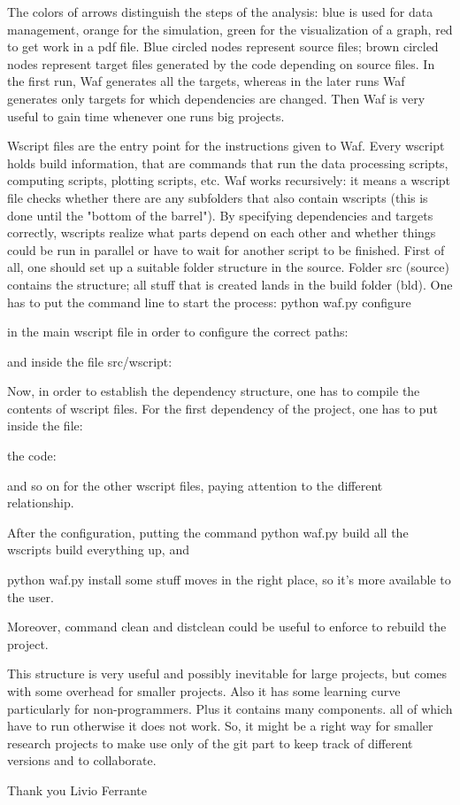 \documentclass{article}
\begin{document}
The colors of arrows distinguish the steps of the analysis: blue is used for data management, orange for the simulation, green for the visualization of a graph, red to get work in a pdf file.
Blue circled nodes represent source files; brown circled nodes represent target files generated by the code depending on source files. 
In the first run, Waf generates all the targets, whereas in the later runs Waf generates only targets for which dependencies are changed. Then Waf is very useful to gain time whenever one runs big projects. 

Wscript files are the entry point for the instructions given to Waf. Every wscript holds build information, that are commands that run the data processing scripts,  computing scripts, plotting scripts, etc. 
Waf works recursively: it means a wscript file checks whether there are any subfolders that also contain wscripts (this is done until the "bottom of the barrel"). By specifying dependencies and targets correctly, wscripts realize what parts depend on each other and whether things could be run in parallel or have to wait for another script to be finished.
First of all, one should set up a suitable folder structure in the source. Folder src (source) contains the structure; all stuff that is created lands in the build folder (bld). 
One has to put the command line to start the process:  
python waf.py configure  

in the main wscript file in order to configure the correct paths:

and inside the file src/wscript:

Now, in order to establish the dependency structure, one has to compile the contents of wscript files.
For the first dependency of the project, one has to put inside the file:


the code:

and so on for the other wscript files, paying attention to the different relationship.

After the configuration, putting the command
python waf.py build
all the wscripts build everything up, and

python waf.py install
some stuff moves in the right place, so it's more available to the user.


Moreover, command clean and distclean could be useful to enforce to rebuild the project. 

This structure is very useful and possibly inevitable for large projects, but comes with some overhead for smaller projects. Also it has some learning curve particularly for non-programmers. Plus it contains many components. all of which have to run otherwise it does not work. 
So, it might be a right way for smaller research projects to make use only of the git part to keep track of different versions and to collaborate. 

Thank you
Livio Ferrante
\end{document}
